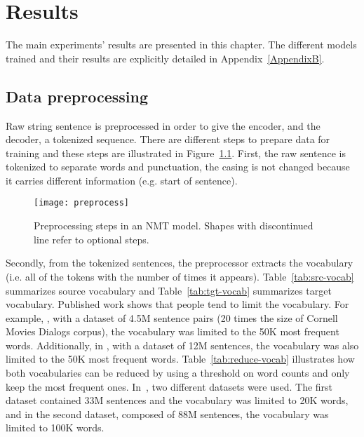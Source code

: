 
\chapter{Results} %
\label{Chapter4} %

The main experiments' results are presented in this chapter. The different models trained and their results are explicitly detailed in Appendix~\ref{AppendixB}.


\section{Data preprocessing}
Raw string sentence is preprocessed in order to give the encoder, and the decoder, a tokenized sequence. There are different steps to prepare data for training and these steps are illustrated in Figure~\ref{fig:preprocess}. First, the raw sentence is tokenized to separate words and punctuation, the casing is not changed because it carries different information (e.g. start of sentence).

\begin{figure}
    \centering
    \texttt{[image: preprocess]}
    \decoRule
    \caption[Preprocessing steps in NMT]{Preprocessing steps in an NMT model. Shapes with discontinued line refer to optional steps.}
    \label{fig:preprocess}
\end{figure}

Secondly, from the tokenized sentences, the preprocessor extracts the vocabulary (i.e. all of the tokens with the number of times it appears). Table~\ref{tab:src-vocab} summarizes source vocabulary and Table~\ref{tab:tgt-vocab} summarizes target vocabulary.
Published work shows that people tend to limit the vocabulary. For example, \citet{1508.04025}, with a dataset of 4.5M sentence pairs (20 times the size of Cornell Movies Dialogs corpus), the vocabulary was limited to the 50K most frequent words. Additionally, in \citet{1506.06714}, with a dataset of 12M sentences, the vocabulary was also limited to the 50K most frequent words.
Table~\ref{tab:reduce-vocab} illustrates how both vocabularies can be reduced by using a threshold on word counts and only keep the most frequent ones.
In~\citet{1506.05869}, two different datasets were used. The first dataset contained 33M sentences and the vocabulary was limited to 20K words, and in the second dataset, composed of 88M sentences, the vocabulary was limited to 100K words.

